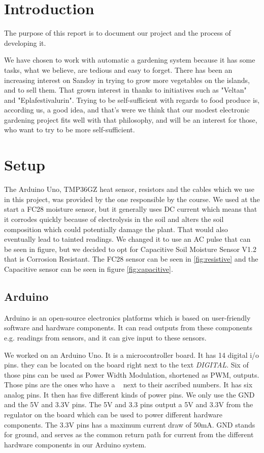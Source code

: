 \documentclass[a4paper,12pt,twoside,openright,titlepage]{book}
\begin{document}
\mainmatter
\chapter{Introduction}

The purpose of this report is to document our project and the process of developing it.

We have chosen to work with automatic a gardening system because it has some tasks, what we believe, are tedious and easy to forget. There has been an increasing interest on Sandoy in trying to grow more vegetables on the islands, and to sell them. That grown interest in thanks to initiatives such as "Veltan" and "Eplafestivalurin". Trying to be self-sufficient with regards to food produce is, according us, a good idea, and that's were we think that our modest electronic gardening project fits well with that philosophy, and will be an interest for those, who want to try to be more self-sufficient.
 

\chapter{Setup}
The Arduino Uno, TMP36GZ heat sensor, resistors and the cables which we use in this project, was provided by the one responsible by the course. We used at the start a FC28 moisture sensor, but it generally uses DC current which means that it corrodes quickly because of electrolysis in the soil and alters the soil composition which could potentially damage the plant. That would also eventually lead to tainted readings. We changed it to use an AC pulse that can be seen in figure, but we decided to opt for Capacitive Soil Moisture Sensor V1.2 that is Corrosion Resistant. The FC28 sensor can be seen in \ref{fig:resistive} and the Capacitive sensor can be seen in figure \ref{fig:capacitive}.

\section{Arduino}
Arduino is an open-source electronics platforms which is based on user-friendly software and hardware components\cite{ArduinoIntroduction}. It can read outputs from these components e.g. readings from sensors, and it can give input to these sensors.

We worked on an Arduino Uno. It is a microcontroller board. It has 14 digital i/o pins. they can be located on the board right next to the text \textit{DIGITAL}. Six of those pins can be used as Power Width Modulation, shortened as PWM, outputs. Those pins are the ones who have a ~ next to their ascribed numbers. It has six analog pins. It then has five different kinds of power pins. We only use the GND and the 5V and 3.3V pins. The 5V and 3.3 pins output a 5V and 3.3V from the regulator on the board which can be used to power different hardware components. The 3.3V pins has a maximum current draw of 50mA. GND stands for ground, and serves as the common return path for current from the different hardware components in our Arduino system. 
\end{document}
